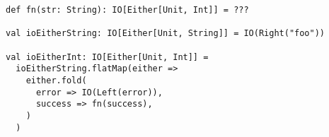 \begin{algorithm}

\begin{verbatim}
def fn(str: String): IO[Either[Unit, Int]] = ???

val ioEitherString: IO[Either[Unit, String]] = IO(Right("foo"))

val ioEitherInt: IO[Either[Unit, Int]] =
  ioEitherString.flatMap(either =>
    either.fold(
      error => IO(Left(error)),
      success => fn(success),
    )
  )
\end{verbatim}

\caption{Syntactic overhead of nesting Either and IO monads.%
\label{monadtransformer:io-either}}
\end{algorithm}